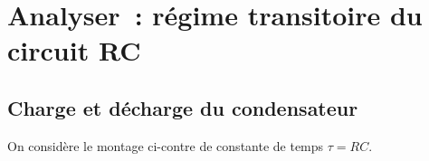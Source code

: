 \documentclass[../main/main.tex]{subfiles}
\begin{document}
\setcounter{section}{2}
\section{Analyser~: régime transitoire du circuit RC}


\subsection{Charge et décharge du condensateur}
\label{ssec:chdech}

On considère le montage ci-contre de constante de temps $\tau = RC$.
\end{document}
